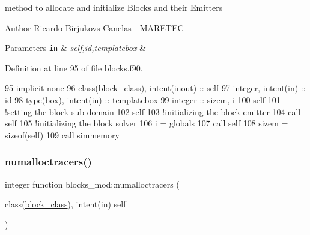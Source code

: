 method to allocate and initialize Blocks and their Emitters 

\begin{DoxyAuthor}{Author}
Ricardo Birjukovs Canelas -\/ M\+A\+R\+E\+T\+EC 
\end{DoxyAuthor}

\begin{DoxyParams}[1]{Parameters}
\mbox{\tt in}  & {\em self,id,templatebox} & \\
\hline
\end{DoxyParams}


Definition at line 95 of file blocks.\+f90.


\begin{DoxyCode}
95     \textcolor{keywordtype}{implicit none}
96     \textcolor{keywordtype}{class}(block\_class), \textcolor{keywordtype}{intent(inout)} :: self
97     \textcolor{keywordtype}{integer}, \textcolor{keywordtype}{intent(in)} :: id
98     \textcolor{keywordtype}{type}(box), \textcolor{keywordtype}{intent(in)} :: templatebox
99     \textcolor{keywordtype}{integer} :: sizem, i
100     self%
101     \textcolor{comment}{!setting the block sub-domain}
102     self%
103     \textcolor{comment}{!initializing the block emitter}
104     \textcolor{keyword}{call }self%
105     \textcolor{comment}{!initializing the block solver}
106     i = globals%
107     \textcolor{keyword}{call }self%
108     sizem = sizeof(self)
109     \textcolor{keyword}{call }simmemory%
\end{DoxyCode}
\mbox{\label{namespaceblocks__mod_a7202fad0fdc07ff9111e61e3aa513af9}} 
\subsubsection{\texorpdfstring{numalloctracers()}{numalloctracers()}}
{\footnotesize\ttfamily integer function blocks\+\_\+mod\+::numalloctracers (\begin{DoxyParamCaption}\item[{class(\mbox{\hyperlink{structblocks__mod_1_1block__class}{block\+\_\+class}}), intent(in)}]{self }\end{DoxyParamCaption})\hspace{0.3cm}{\ttfamily [private]}}




